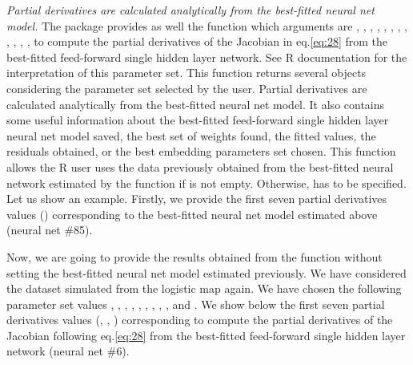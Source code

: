 \textit{Partial derivatives are calculated analytically from the best-fitted neural net model.} The  package provides as well the function  which arguments are , , , , , , , , , , , , to compute the partial derivatives of the Jacobian in eq.\ref{eq:28} from the best-fitted feed-forward single hidden layer network. See R documentation for the interpretation of this parameter set. This function returns several objects considering the parameter set selected by the user. Partial derivatives are calculated analytically from the best-fitted neural net model. It also contains some useful information about the best-fitted feed-forward single hidden layer neural net model saved, the best set of weights found, the fitted values, the residuals obtained, or the best embedding parameters set chosen. This function allows the R user uses the data previously obtained from the best-fitted neural network estimated by the  function if  is not empty. Otherwise,  has to be specified. Let us show an example. Firstly, we provide the first seven partial derivatives values () corresponding to the best-fitted neural net model estimated above (neural net $\#$85).


Now, we are going to provide the results obtained from the function  without setting the best-fitted neural net model estimated previously. We have considered the dataset simulated from the logistic map again. We have chosen the following parameter set values , , , , , , , , , and . We show below the first seven partial derivatives values (, , ) corresponding to compute the partial derivatives of the Jacobian following eq.\ref{eq:28} from the best-fitted feed-forward single hidden layer network (neural net $\#$6).


